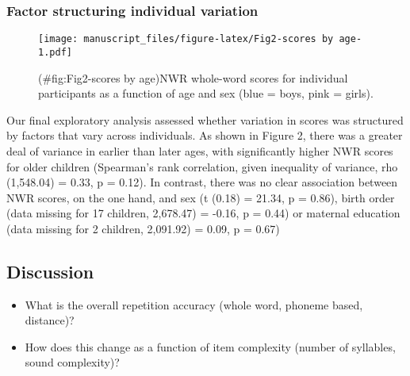 \documentclass[english,,man,floatsintext]{apa6}
\begin{document}
\subsubsection{Factor structuring individual
variation}\label{factor-structuring-individual-variation}

\begin{figure}
\centering
\texttt{[image: manuscript\_files/figure-latex/Fig2-scores by age-1.pdf]}
\caption{(\#fig:Fig2-scores by age)NWR whole-word scores for individual
participants as a function of age and sex (blue = boys, pink = girls).}
\end{figure}

Our final exploratory analysis assessed whether variation in scores was
structured by factors that vary across individuals. As shown in Figure
2, there was a greater deal of variance in earlier than later ages, with
significantly higher NWR scores for older children (Spearman's rank
correlation, given inequality of variance, rho (1,548.04) = 0.33, p =
0.12). In contrast, there was no clear association between NWR scores,
on the one hand, and sex (t (0.18) = 21.34, p = 0.86), birth order (data
missing for 17 children, 2,678.47) = -0.16, p = 0.44) or maternal
education (data missing for 2 children, 2,091.92) = 0.09, p = 0.67)

\subsection{Discussion}\label{discussion}

\begin{itemize}
\item
  What is the overall repetition accuracy (whole word, phoneme based,
  distance)?
\item
  How does this change as a function of item complexity (number of
  syllables, sound complexity)?
\end{itemize}
\end{document}
